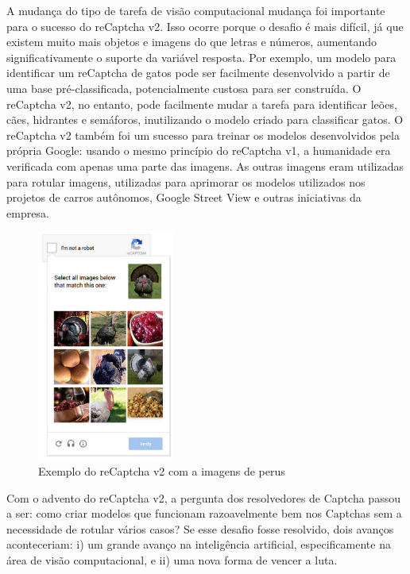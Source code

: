 \documentclass[12pt,twoside,brazilian]{book}
\begin{document}
A mudança do tipo de tarefa de visão computacional mudança foi
importante para o sucesso do reCaptcha v2. Isso ocorre porque o desafio
é mais difícil, já que existem muito mais objetos e imagens do que
letras e números, aumentando significativamente o suporte da variável
resposta. Por exemplo, um modelo para identificar um reCaptcha de gatos
pode ser facilmente desenvolvido a partir de uma base pré-classificada,
potencialmente custosa para ser construída. O reCaptcha v2, no entanto,
pode facilmente mudar a tarefa para identificar leões, cães, hidrantes e
semáforos, inutilizando o modelo criado para classificar gatos. O
reCaptcha v2 também foi um sucesso para treinar os modelos desenvolvidos
pela própria Google: usando o mesmo princípio do reCaptcha v1, a
humanidade era verificada com apenas uma parte das imagens. As outras
imagens eram utilizadas para rotular imagens, utilizadas para aprimorar
os modelos utilizados nos projetos de carros autônomos, Google Street
View e outras iniciativas da empresa.

\begin{figure}

{\centering \includegraphics[width=0.4\textwidth,height=\textheight]{./assets/img/turkey.png}

}

\caption{\label{fig-turkey}Exemplo do reCaptcha v2 com a imagens de
perus}

\end{figure}

Com o advento do reCaptcha v2, a pergunta dos resolvedores de Captcha
passou a ser: como criar modelos que funcionam razoavelmente bem nos
Captchas sem a necessidade de rotular vários casos? Se esse desafio
fosse resolvido, dois avanços aconteceriam: i) um grande avanço na
inteligência artificial, especificamente na área de visão computacional,
e ii) uma nova forma de vencer a luta.
\end{document}
